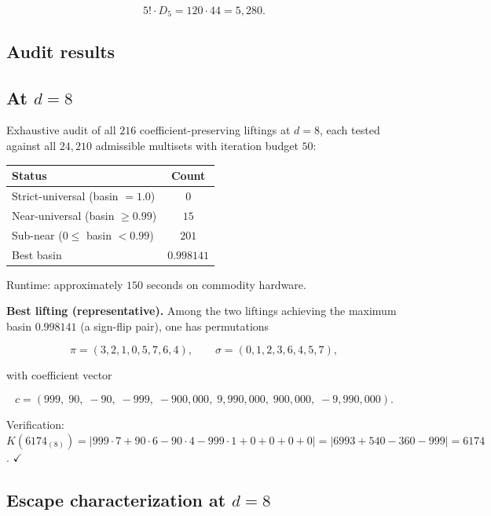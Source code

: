 \documentclass[11pt,letterpaper]{article}
\theoremstyle{paperstyle}
\theoremstyle{paperstyledef}
\theoremstyle{paperstylerem}
\begin{document}
\[5! \cdot D_5 = 120 \cdot 44 = 5{,}280.\]

\hypertarget{e.2-audit-results}{%
\subsection{Audit results}\label{e.2-audit-results}}

\hypertarget{e.2.1-at-d-8}{%
\subsection{\texorpdfstring{At \(d = 8\)}{At d = 8}}\label{e.2.1-at-d-8}}

Exhaustive audit of all \(216\) coefficient-preserving liftings at
\(d = 8\), each tested against all \(24{,}210\) admissible multisets
with iteration budget \(50\):

\begin{longtable}[]{@{}lc@{}}
\toprule\noalign{}
Status & Count \\
\midrule\noalign{}
\endhead
\bottomrule\noalign{}
\endlastfoot
Strict-universal (basin \(= 1.0\)) & \(0\) \\
Near-universal (basin \(\geq 0.99\)) & \(15\) \\
Sub-near (\(0 \leq\) basin \(< 0.99\)) & \(201\) \\
Best basin & \(0.998141\) \\
\end{longtable}

Runtime: approximately \(150\) seconds on commodity hardware.

\textbf{Best lifting (representative).} Among the two liftings achieving
the maximum basin \(0.998141\) (a sign-flip pair), one has permutations

\[\pi = (3, 2, 1, 0, 5, 7, 6, 4), \qquad \sigma = (0, 1, 2, 3, 6, 4, 5, 7),\]

with coefficient vector

\[c = (999,\; 90,\; -90,\; -999,\; -900{,}000,\; 9{,}990{,}000,\; 900{,}000,\; -9{,}990{,}000).\]

Verification:
\(K(6174_{(8)}) = |999 \cdot 7 + 90 \cdot 6 - 90 \cdot 4 - 999 \cdot 1 + 0 + 0 + 0 + 0| = |6993 + 540 - 360 - 999| = 6174\).
\(\checkmark\)

\hypertarget{e.2.2-escape-characterization-at-d-8}{%
\subsection{\texorpdfstring{Escape characterization at \(d = 8\)}{Escape characterization at d = 8}}\label{e.2.2-escape-characterization-at-d-8}}
\end{document}
